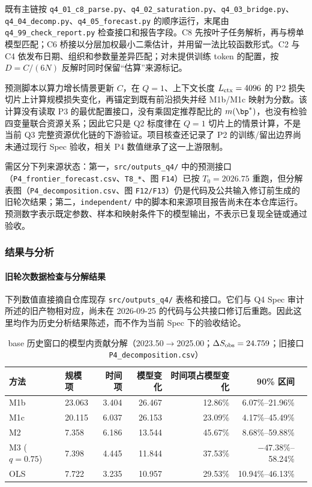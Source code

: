 既有主链按 \texttt{q4\_01\_c8\_parse.py}、\texttt{q4\_02\_saturation.py}、\texttt{q4\_03\_bridge.py}、\texttt{q4\_04\_decomp.py}、\texttt{q4\_05\_forecast.py} 的顺序运行，末尾由 \texttt{q4\_99\_check\_report.py} 检查接口和报告字段。C8 先按叶子任务解析，再与榜单模型匹配；C6 桥接以分层加权最小二乘估计，并用留一法比较函数形式。C2 与 C4 依发布日期、组织和参数量差异匹配；对未提供训练 token 的配置，按 $D=C/(6N)$ 反解时同时保留“估算”来源标记。

预测脚本以算力增长情景更新 $C$，在 $Q=1$、上下文长度 $L_{\rm ctx}=4096$ 的 P2 损失切片上计算规模损失变化，再锚定到既有前沿损失并经 M1b/M1c 映射为分数。该计算没有读取 P3 的最优配置接口，没有乘固定推荐配比的 $m(\bp^*)$，也没有检验四变量联合资源关系；因此它只是 Q2 标度律在 $Q=1$ 切片上的情景计算，不是当前 Q3 完整资源优化链的下游验证。项目核查还记录了 P2 的训练/留出边界尚未通过现行 Spec 验收，相关 P4 数值继承了这一上游限制。

需区分下列来源状态：第一，\texttt{src/outputs\_q4/} 中的预测接口（\texttt{P4\_frontier\_forecast.csv}、\texttt{T8\_*}、图 \texttt{F14}）已按 $T_0=2026.75$ 重跑，但分解表图（\texttt{P4\_decomposition.csv}、图 \texttt{F12/F13}）仍是代码及公共输入修订前生成的旧轮次结果；第二，\texttt{independent/} 中的脚本和来源项目报告尚未在本仓库运行。预测数字表示既定参数、样本和映射条件下的模型输出，不表示已复现全链或通过验收。

\subsubsection{结果与分析}
\label{sec:5.5.3}

\paragraph{旧轮次数据检查与分解结果}

下列数值直接摘自仓库现存 \texttt{src/outputs\_q4/} 表格和接口。它们与 Q4 Spec 审计所述的旧产物相对应，尚未在 2026-09-25 的代码与公共接口修订后重跑。因此这里均作为历史分析结果陈述，而不作为当前 Spec 下的验收结论。

\begin{table}[H]
\centering\footnotesize
\caption{base 历史窗口的模型内贡献分解（2023.50$\to$2025.00；$\Delta S_{\rm obs}=24.759$；旧接口 \texttt{P4\_decomposition.csv}）}
\label{tab:q4decomp}
\begin{tabularx}{\textwidth}{@{}l X r r r r r@{}}
\toprule
方法 & 规模项 & 时间项 & 模型变化 & 时间项占模型变化 & 90\% 区间 \\
\midrule
M1b & 23.063 & 3.404 & 26.467 & 12.86\% & 6.07\%--21.96\% \\
M1c & 20.115 & 6.037 & 26.153 & 23.09\% & 4.17\%--45.49\% \\
M2 & 7.358 & 6.186 & 13.544 & 45.67\% & 8.68\%--59.88\% \\
M3 ($q=0.75$) & 7.398 & 4.445 & 11.844 & 37.53\% & $-47.38\%$--58.24\% \\
OLS & 7.722 & 3.235 & 10.957 & 29.53\% & 10.94\%--46.13\% \\
\bottomrule
\end{tabularx}
\end{table}


